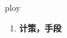 
\begin{frame}
{\huge ploy}
\begin{center}
\begin{enumerate}\Large
  \item \textbf{计策，手段}
\end{enumerate}
\end{center}
\end{frame}
